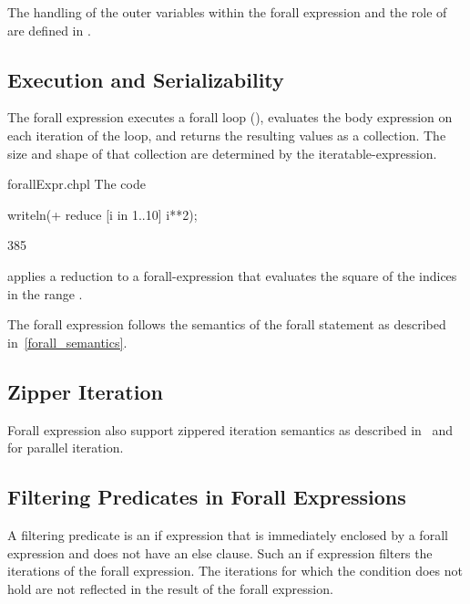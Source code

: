 The handling of the outer variables within the forall expression and
the role of  are defined in .

\subsection{Execution and Serializability}
\label{Forall_Expression_Execution_and_Serializability}

The forall expression executes a forall loop (),
evaluates the body expression on each iteration of the loop, and
returns the resulting values as a collection.  The size and shape of
that collection are determined by the iteratable-expression.

\begin{chapelexample}{forallExpr.chpl}
The code
\begin{chapel}
writeln(+ reduce [i in 1..10] i**2);
\end{chapel}
\begin{chapeloutput}
385
\end{chapeloutput}
applies a reduction to a forall-expression that evaluates the square
of the indices in the range .
\end{chapelexample}

The forall expression follows the semantics of the forall statement as
described in~\ref{forall_semantics}.

\subsection{Zipper Iteration}
Forall expression also support zippered iteration semantics as
described in~ and~ for
parallel iteration.

\subsection{Filtering Predicates in Forall Expressions}
\label{Filtering_Predicates_Forall}

A filtering predicate is an if expression that is immediately enclosed
by a forall expression and does not have an
else clause.  Such an if expression filters the iterations of the
forall expression.  The iterations for which the condition does not
hold are not reflected in the result of the forall expression.

